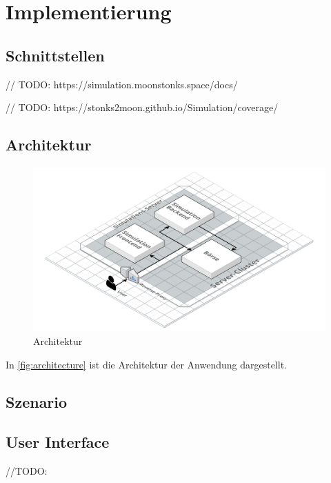 \chapter{Implementierung}

\section{Schnittstellen}
// TODO: https://simulation.moonstonks.space/docs/

// TODO: https://stonks2moon.github.io/Simulation/coverage/

\section{Architektur}
\begin{figure}[ht]
    \includegraphics[width=\textwidth]{img/architecture.png}
    \centering
    \caption{Architektur}
    \label{fig:architecture}
\end{figure}

In \autoref{fig:architecture} ist die Architektur der Anwendung dargestellt.

\section{Szenario}

\section{User Interface}
//TODO:
